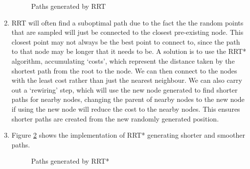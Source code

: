 \documentclass[12pt,a4paper]{article}
\begin{document}
\begin{enumerate}[label=(\alph*)]
\begin{figure}[h!]
		\qquad
		\caption{Paths generated by RRT}		
		\label{fig:rrt}%
		\end{figure}

	\item RRT will often find a suboptimal path due to the fact the the random points that are sampled will just be connected to the closest pre-existing node. This closest point may not always be the best point to connect to, since the path to that node may be longer that it needs to be. A solution is to use the RRT* algorithm, accumulating `costs', which represent the distance taken by the shortest path from the root to the node. We can then connect to the nodes with the least cost rather than just the nearest neighbour. We can also carry out a `rewiring' step, which will use the new node generated to find shorter paths for nearby nodes, changing the parent of nearby nodes to the new node if using the new node will reduce the cost to the nearby nodes. This ensures shorter paths are created from the new randomly generated position.
	\item Figure \ref{fig:rrt-star} shows the implementation of RRT* generating shorter and smoother paths.
	\begin{figure}[h!]
		\centering
		\qquad
		\caption{Paths generated by RRT*}		
		\label{fig:rrt-star}%
	\end{figure}


\end{enumerate}
\end{document}
